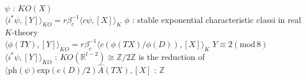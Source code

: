 \begin{Theorem}[Theorem 3]
\itemprop
  \For \(\psi\) : \(KO(X)\) \\
  \Then \(\langle i^* \psi , [Y] \rangle_{KO} = r \beta_c^{-1} \langle c \psi , [X] \rangle_{K}\)
\itemprop
  \For \(\phi\) : stable exponential characteristic classi in real \(K\)-theory \\
  \Then \(\langle \phi(TY) , [Y] \rangle_{KO} = r \beta_c^{-1} \langle c ( \phi(TX) / \phi(D)) , [X] \rangle_K\)
\itemprop
  \IfHold \(Y \equiv 2 (\text{mod} \, 8)\) \\
  \Then \(\langle i^*\psi , [Y] \rangle_{KO}\) : \(KO(\mathbb{R}^{t-2}) \cong \mathbb{Z}/2\mathbb{Z}\) is the reduction of \(\langle \text{ph}(\psi) \text{exp}(e(D) / 2) \hat{A}(TX) , [X]\) : \(\mathbb{Z}\)
\end{Theorem}